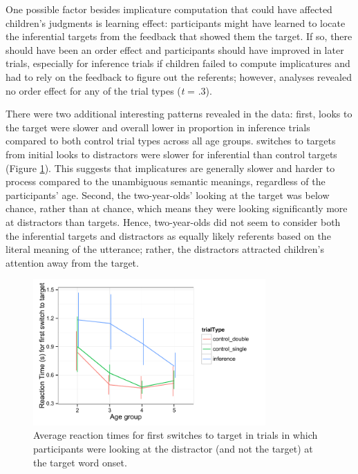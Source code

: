 \documentclass[10pt,letterpaper]{article}
\begin{document}
One possible factor besides implicature computation that could have affected children's judgments is learning effect: participants might have learned to locate the inferential targets from the feedback that showed them the target. If so, there should have been an order effect and participants should have improved in later trials, especially for inference trials if children failed to compute implicatures and had to rely on the feedback to figure out the referents; however, analyses revealed no order effect for any of the trial types (\emph{t} = .3).  

There were two additional interesting patterns revealed in the data: first, looks to the target were slower and overall lower in proportion in inference trials compared to both control trial types across all age groups. switches to targets from initial looks to distractors were slower for inferential than control targets (Figure \ref{fig:rt}). This suggests that implicatures are generally slower and harder to process compared to the unambiguous semantic meanings, regardless of the participants' age. Second, the two-year-olds' looking at the target was below chance, rather than at chance, which means they were looking significantly more at distractors than targets. Hence, two-year-olds did not seem to consider both the inferential targets and distractors as equally likely referents based on the literal meaning of the utterance; rather, the distractors attracted children's attention away from the target. 

\begin{figure}
\begin{center} 
\includegraphics[width=3.5in]{figures/150116-0-rt_age.pdf}
\caption{\label{fig:rt} Average reaction times for first switches to target in trials in which participants were looking at the distractor (and not the target) at the target word onset.}
\end{center} 
\end{figure}
\end{document}

